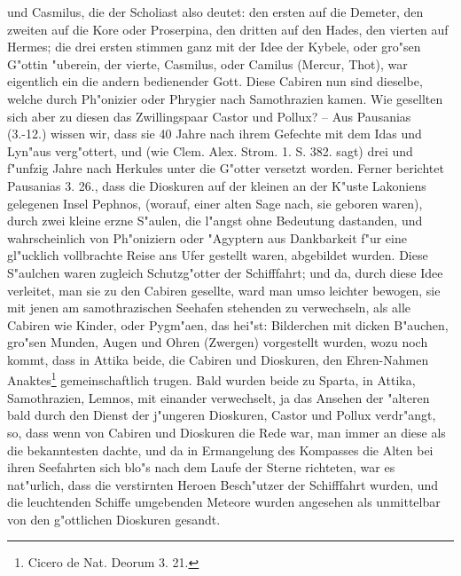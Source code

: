 \documentclass[a4paper, 11pt, oneside, polutonikogreek, german]{article}
\begin{document}
und Casmilus, die der Scholiast also deutet: den ersten auf die Demeter, den zweiten auf die Kore oder Proserpina, den dritten auf den Hades, den vierten auf Hermes; die drei ersten stimmen ganz mit der Idee der Kybele, oder gro"sen G"ottin "uberein, der vierte, Casmilus, oder Camilus (Mercur, Thot), war eigentlich ein die andern bedienender Gott. Diese Cabiren nun sind dieselbe, welche durch Ph"onizier oder Phrygier nach Samothrazien kamen. Wie gesellten sich aber zu diesen das Zwillingspaar Castor und Pollux? -- Aus Pausanias (3.-12.) wissen wir, dass sie 40 Jahre nach ihrem Gefechte mit dem Idas und Lyn"aus verg"ottert, und (wie Clem. Alex. Strom. 1. S. 382. sagt) drei und f"unfzig Jahre nach Herkules unter die G"otter versetzt worden. Ferner berichtet Pausanias 3. 26., dass die Dioskuren auf der kleinen an der K"uste Lakoniens gelegenen Insel Pephnos, (worauf, einer alten Sage nach, sie geboren waren), durch zwei kleine erzne S"aulen, die l"angst ohne Bedeutung dastanden, und wahrscheinlich von Ph"oniziern oder "Agyptern aus Dankbarkeit f"ur eine gl"ucklich vollbrachte Reise ans Ufer gestellt waren, abgebildet wurden. Diese S"aulchen waren zugleich Schutzg"otter der Schifffahrt; und da, durch diese Idee verleitet, man sie zu den Cabiren gesellte, ward man umso leichter bewogen, sie mit jenen am samothrazischen Seehafen stehenden zu verwechseln, als alle Cabiren wie Kinder, oder Pygm"aen, das hei"st: Bilderchen mit dicken B"auchen, gro"sen Munden, Augen und Ohren (Zwergen) vorgestellt wurden, wozu noch kommt, dass in Attika beide, die Cabiren und Dioskuren, den Ehren-Nahmen Anaktes\footnote{Cicero de Nat. Deorum 3. 21.} gemeinschaftlich trugen. Bald wurden beide zu Sparta, in Attika, Samothrazien, Lemnos, mit einander verwechselt, ja das Ansehen der "alteren bald durch den Dienst der j"ungeren Dioskuren, Castor und Pollux verdr"angt, so, dass wenn von Cabiren und Dioskuren die Rede war, man immer an diese als die bekanntesten dachte, und da in Ermangelung des Kompasses die Alten bei ihren Seefahrten sich blo"s nach dem Laufe der Sterne richteten, war es nat"urlich, dass die verstirnten Heroen Besch"utzer der Schifffahrt wurden, und die leuchtenden Schiffe umgebenden Meteore wurden angesehen als unmittelbar von den g"ottlichen Dioskuren gesandt.
\end{document}
